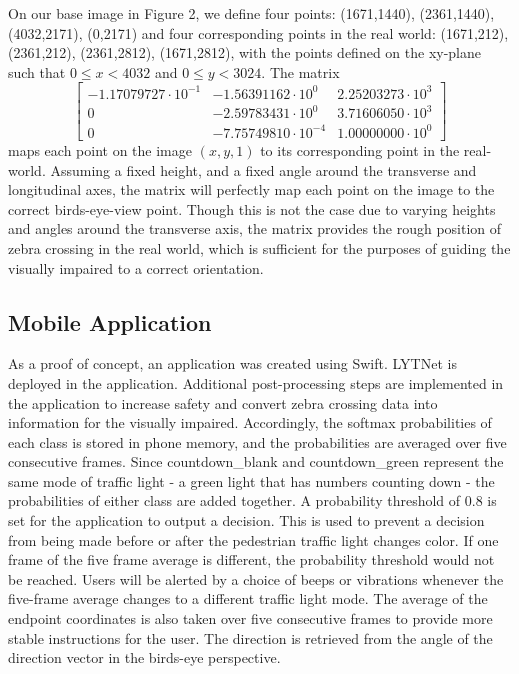 \documentclass[runningheads]{llncs}
\begin{document}
On our base image in Figure 2, we define four points: (1671,1440), (2361,1440), (4032,2171), (0,2171) and four corresponding points in the real world: (1671,212), (2361,212), (2361,2812), (1671,2812), with the points defined on the xy-plane such that $0 \leq x < 4032$ and $0 \leq y < 3024$. The matrix
$$
\begin{bmatrix}
-1.17079727\cdot10^{-1} & -1.56391162\cdot10^{0} & 2.25203273\cdot10^{3}\\
0 & -2.59783431\cdot10^{0} & 3.71606050\cdot10^{3}\\
0 & -7.75749810\cdot10^{-4} & 1.00000000\cdot10^{0}
\end{bmatrix}
$$
maps each point on the image $(x,y,1)$ to its corresponding point in the real-world. Assuming a fixed height, and a fixed angle around the transverse and longitudinal axes, the matrix will perfectly map each point on the image to the correct birds-eye-view point. Though this is not the case due to varying heights and angles around the transverse axis, the matrix provides the rough position of zebra crossing in the real world, which is sufficient for the purposes of guiding the visually impaired to a correct orientation. 
\subsection{Mobile Application}
As a proof of concept, an application was created using Swift. LYTNet is deployed in the application. Additional post-processing steps are implemented in the application to increase safety and convert zebra crossing data into information for the visually impaired. Accordingly, the softmax probabilities of each class is stored in phone memory, and the probabilities are averaged over five consecutive frames. Since countdown\_blank and countdown\_green represent the same mode of traffic light - a green light that has numbers counting down - the probabilities of either class are added together. A probability threshold of 0.8 is set for the application to output a decision. This is used to prevent a decision from being made before or after the pedestrian traffic light changes color. If one frame of the five frame average is different, the probability threshold would not be reached. Users will be alerted by a choice of beeps or vibrations whenever the five-frame average changes to a different traffic light mode. The average of the endpoint coordinates is also taken over five consecutive frames to provide more stable instructions for the user. The direction is retrieved from the angle of the direction vector in the birds-eye perspective. 
\end{document}
